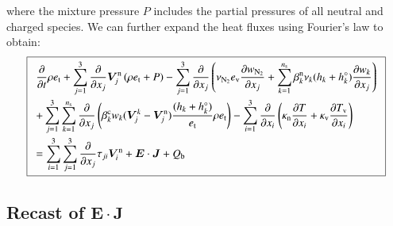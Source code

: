 \documentclass{warpdoc}
\newcommand\frameeqn[1]{\fbox{$\displaystyle #1$}}
\newcommand{\alb}{\vspace{0.1cm}\\} %
\newcommand{\mfd}{\displaystyle}
\newcommand{\ns}{{n_{\rm s}}}
\newcommand{\ev}{{e_{\rm v}}}
\renewcommand{\vec}[1]{\bm{#1}}
\begin{document}
%  
where the mixture pressure $P$ includes the partial pressures of all neutral and charged species. We can further expand the heat fluxes using Fourier's law to obtain:
%
\begin{equation}
\frameeqn{
\begin{array}{l}\mfd
 \frac{\partial }{\partial t}\rho e_{\rm t}
+ \sum_{j=1}^3  \frac{\partial }{\partial x_j} \vec{V}_j^{\rm n} \left(\rho  e_{\rm t} +  P \right)
- \sum_{j=1}^3  \frac{\partial }{\partial x_j} \left(
   \nu_{\rm N_2} \ev\frac{\partial w_{\rm N_2}}{\partial x_j} + \sum_{k=1}^\ns \beta_k^{\rm n} \nu_k (h_k+h_k^\circ)\frac{\partial w_k}{\partial x_j} 
\right)
 \alb\mfd
+ \sum_{j=1}^3 \sum_{k=1}^\ns  \frac{\partial }{\partial x_j} \left(
  \beta_k^{\rm c} w_k (\vec{V}^k_j-\vec{V}^{\rm n}_j) \frac{(h_k+h_k^\circ)}{e_{\rm t}} \rho e_{\rm t} 
\right)
-\sum_{i=1}^{3}\frac{\partial }{\partial x_i}\left(\kappa_{\rm n} \frac{\partial T}{\partial x_i} 
+ \kappa_{\rm v} \frac{\partial T_{\rm v}}{\partial x_i}\right)
\alb\mfd
=
 \sum_{i=1}^3 \sum_{j=1}^3  \frac{\partial }{\partial x_j} \tau_{ji} \vec{V}_i^{\rm n}
+ \vec{E}\cdot\vec{J}
+ Q_{\rm b}
\end{array}
}
\label{eqn:etotal8}
\end{equation}
%  





\subsection{Recast of $\vec{E}\cdot \vec{J}$}
\end{document}
